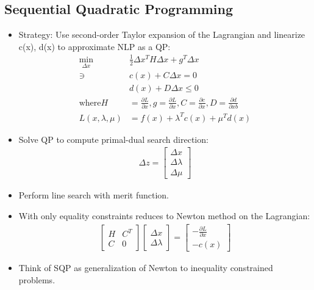\subsection{Sequential Quadratic Programming}
\begin{itemize}
    \item Strategy: Use second-order Taylor expansion of the Lagrangian and linearize c(x), d(x) to approximate NLP as a QP:
    \begin{align}
        \min_{\Delta x} & \frac{1}{2} \Delta x^T H \Delta x + g^T \Delta x \\
        \ni & c(x)+ C \Delta x = 0 \\
        & d(x) + D \Delta x \leq 0 \\
        \text{where} H & = \frac{\partial L}{\partial x}, g = \frac{\partial L}{\partial x}, C = \frac{\partial c}{\partial x}, D = \frac{\partial d}{\partial xb} \\
        L(x, \lambda, \mu) & = f(x) + \lambda^T c(x) + \mu^T d(x)
    \end{align}
    \item Solve QP to compute primal-dual search direction:
    \begin{align}
        \Delta z = \begin{bmatrix}
            \Delta x \\ \Delta \lambda \\ \Delta \mu
        \end{bmatrix}
    \end{align}
    \item Perform line search with merit function.
    \item With only equality constraints reduces to Newton method on the Lagrangian:
    \begin{align}
        \begin{bmatrix}
            H & C^T \\ C & 0
        \end{bmatrix}
        \begin{bmatrix}
            \Delta x \\ \Delta \lambda
        \end{bmatrix} = 
        \begin{bmatrix}
            -\frac{\partial L}{\partial x} \\ -c(x)
        \end{bmatrix}
    \end{align}
    \item Think of SQP as generalization of Newton to inequality constrained problems.

\end{itemize}
